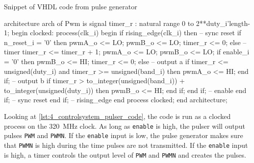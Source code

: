 \begin{listing}[htbp]
	\caption{Snippet of VHDL code from pulse generator}
	\label{lst:4_controlsystem_pulser_code}
	\begin{mintedvhdl}
architecture arch of Pwm is
	signal timer_r       : natural range 0 to 2**duty_i'length-1;
	begin
		clocked: process(clk_i)
		begin
			if rising_edge(clk_i) then
			-- sync reset
			if n_reset_i = '0' then
				pwmA_o   <= LO;
				pwmB_o   <= LO;
				timer_r <= 0;
			else
			-- timer
				timer_r <= timer_r + 1;
				pwmA_o   <= LO;
				pwmB_o   <= LO;
				if enable_i = '0' then
					pwmB_o   <= HI;
					timer_r <= 0;
				else
					-- output a
					if timer_r <= unsigned(duty_i) and timer_r >= unsigned(band_i)  then
						pwmA_o <= HI;
					end if;
					-- output b
					if timer_r > to_integer(unsigned(band_i)) + to_integer(unsigned(duty_i)) then
						pwmB_o <= HI;
					end if;
				end if; -- enable
			end if; -- sync reset
		end if; -- rising_edge
	end process clocked;
end architecture;
	\end{mintedvhdl}
\end{listing}
Looking at \cref{lst:4_controlsystem_pulser_code}, the code is run as a clocked process on the \qty{320}{\mega\hertz} clock. As long as \texttt{enable} is \gls{high}, the pulser will output pulses \texttt{PWM} and \texttt{PWMN}. If the \texttt{enable} input is \gls{low}, the pulse generator makes sure that \texttt{PWMN} is \gls{high} during the time pulses are not transmitted. If the \texttt{enable} input is \gls{high}, a timer controls the output level of \texttt{PWM} and \texttt{PWMN} and creates the pulses.

